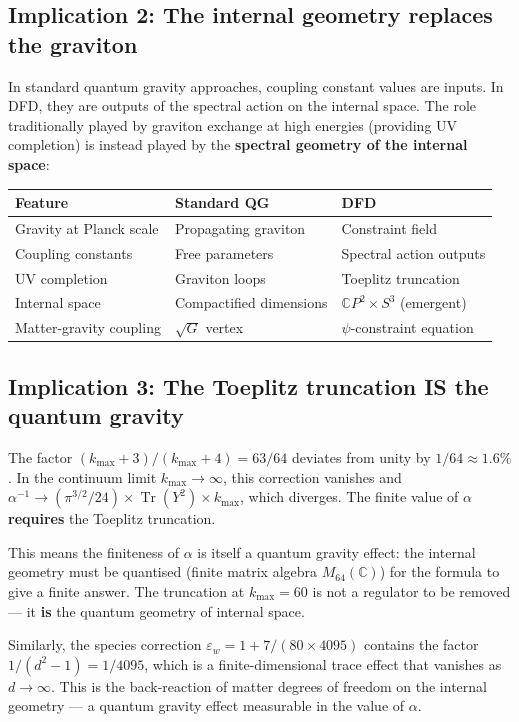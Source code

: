 \documentclass[12pt,a4paper]{article}
\newcommand{\Tr}{\operatorname{Tr}}
\newcommand{\CP}{\mathbb{C}P}
\begin{document}
\subsection{Implication 2: The internal geometry replaces the graviton}

In standard quantum gravity approaches, coupling constant values are inputs. In DFD, they are outputs of the spectral action on the internal space. The role traditionally played by graviton exchange at high energies (providing UV completion) is instead played by the \textbf{spectral geometry of the internal space}:

\begin{center}
\begin{tabular}{lll}
\toprule
\textbf{Feature} & \textbf{Standard QG} & \textbf{DFD} \\
\midrule
Gravity at Planck scale & Propagating graviton & Constraint field \\
Coupling constants & Free parameters & Spectral action outputs \\
UV completion & Graviton loops & Toeplitz truncation \\
Internal space & Compactified dimensions & $\CP^2 \times S^3$ (emergent) \\
Matter-gravity coupling & $\sqrt{G}$ vertex & $\psi$-constraint equation \\
\bottomrule
\end{tabular}
\end{center}

\subsection{Implication 3: The Toeplitz truncation IS the quantum gravity}

The factor $(k_{\max}+3)/(k_{\max}+4) = 63/64$ deviates from unity by $1/64 \approx 1.6\%$. In the continuum limit $k_{\max} \to \infty$, this correction vanishes and $\alpha^{-1} \to (\pi^{3/2}/24) \times \Tr(Y^2) \times k_{\max}$, which diverges. The finite value of $\alpha$ \textbf{requires} the Toeplitz truncation.

This means the finiteness of $\alpha$ is itself a quantum gravity effect: the internal geometry must be quantised (finite matrix algebra $M_{64}(\mathbb{C})$) for the formula to give a finite answer. The truncation at $k_{\max} = 60$ is not a regulator to be removed --- it \textbf{is} the quantum geometry of internal space.

Similarly, the species correction $\varepsilon_w = 1 + 7/(80 \times 4095)$ contains the factor $1/(d^2 - 1) = 1/4095$, which is a finite-dimensional trace effect that vanishes as $d \to \infty$. This is the back-reaction of matter degrees of freedom on the internal geometry --- a quantum gravity effect measurable in the value of $\alpha$.
\end{document}
